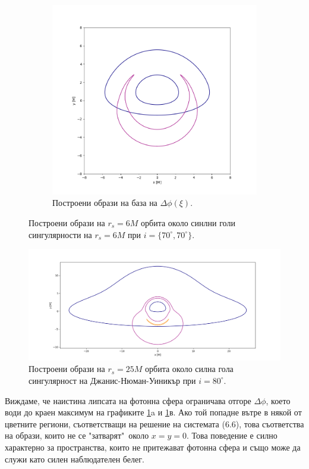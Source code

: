 \begin{figure}[!htb]
\begin{subfigure}{6cm}
		\includegraphics[scale = 0.3]{JNW_70_deg_r6_gamma_0.48.png}
		\caption{Построени образи на база на  $\Delta\phi(\xi)$.} 
	\end{subfigure}
	\caption[Построени образи на $r_s = 6M$ орбита около синлни голи сингулярности.]{\small Построени образи на $r_s = 6M$ орбита около синлни голи сингулярности на $r_s = 6M$ при $i = \{70^\circ, 70^\circ\}$.} 
	\label{GB_JNW_r6}
\end{figure}
\begin{figure}
	\includegraphics[scale = 0.35]{GB_70_deg_r25_gamma_0.48.png}
	\caption[Построени образи на $r_s = 25M$ орбита около синлни гола сингулярност на Джанис-Нюман-Уиникър.]{\small Построени образи на $r_s = 25M$ орбита около силна гола сингулярност на Джанис-Нюман-Уиникър при $i = 80^\circ$.} 
	\label{JNW_r25}
\end{figure}
Виждаме, че наистина липсата на фотонна сфера ограничава отгоре $\Delta\phi$, което води до краен максимум на графиките \ref{GB_JNW_r6}a и \ref{GB_JNW_r6}в. Ако той попадне вътре в някой от цветните региони, съответстващи на решение на системата (6.6), това съответства на образи, които не се "затварят"$\,$ около $x = y = 0$. Това поведение е силно характерно за пространства, които не притежават фотонна сфера и също може да служи като силен наблюдателен белег.

